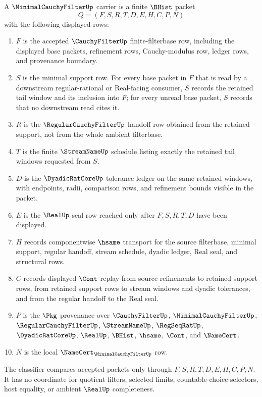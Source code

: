 \begin{definition}\label{def:minimal-cauchy-filter-carrier}
A $\MinimalCauchyFilterUp$ carrier is a finite $\BHist$ packet
$$
Q=(F,S,R,T,D,E,H,C,P,N)
$$
with the following displayed rows:
\begin{enumerate}
\item $F$ is the accepted $\CauchyFilterUp$ finite-filterbase row, including the displayed base packets, refinement rows, Cauchy-modulus row, ledger rows, and provenance boundary.
\item $S$ is the minimal support row. For every base packet in $F$ that is read by a downstream regular-rational or Real-facing consumer, $S$ records the retained tail window and its inclusion into $F$; for every unread base packet, $S$ records that no downstream read cites it.
\item $R$ is the $\RegularCauchyFilterUp$ handoff row obtained from the retained support, not from the whole ambient filterbase.
\item $T$ is the finite $\StreamNameUp$ schedule listing exactly the retained tail windows requested from $S$.
\item $D$ is the $\DyadicRatCoreUp$ tolerance ledger on the same retained windows, with endpoints, radii, comparison rows, and refinement bounds visible in the packet.
\item $E$ is the $\RealUp$ seal row reached only after $F,S,R,T,D$ have been displayed.
\item $H$ records componentwise $\hsame$ transport for the source filterbase, minimal support, regular handoff, stream schedule, dyadic ledger, Real seal, and structural rows.
\item $C$ records displayed $\Cont$ replay from source refinements to retained support rows, from retained support rows to stream windows and dyadic tolerances, and from the regular handoff to the Real seal.
\item $P$ is the $\Pkg$ provenance over $\CauchyFilterUp$, $\MinimalCauchyFilterUp$, $\RegularCauchyFilterUp$, $\StreamNameUp$, $\RegSeqRatUp$, $\DyadicRatCoreUp$, $\RealUp$, $\BHist$, $\hsame$, $\Cont$, and $\NameCert$.
\item $N$ is the local $\NameCert_{\MinimalCauchyFilterUp}$ row.
\end{enumerate}
The classifier compares accepted packets only through $F,S,R,T,D,E,H,C,P,N$. It has no coordinate for quotient filters, selected limits, countable-choice selectors, host equality, or ambient $\RealUp$ completeness.
\end{definition}


